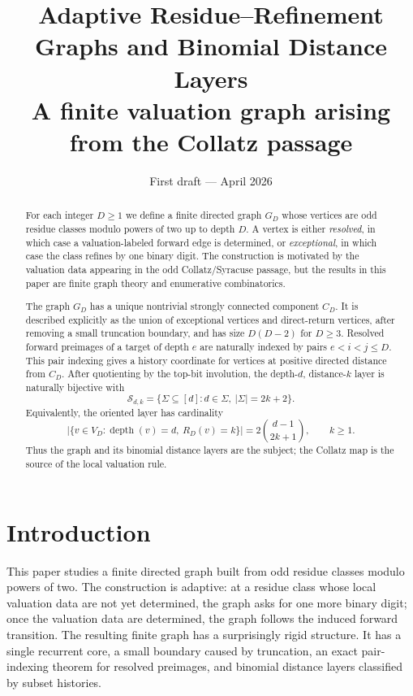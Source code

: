\documentclass[11pt]{article}
\title{Adaptive Residue--Refinement Graphs and Binomial Distance Layers\\
\large A finite valuation graph arising from the Collatz passage}
\author{}
\date{First draft --- April 2026}
\theoremstyle{definition}
\theoremstyle{remark}
\newcommand{\depth}{\operatorname{depth}}
\newcommand{\Sfam}{\mathcal S}
\begin{document}
\maketitle

\begin{abstract}
For each integer $D\ge 1$ we define a finite directed graph $G_D$ whose vertices are odd residue classes modulo powers of two up to depth $D$.  A vertex is either \emph{resolved}, in which case a valuation-labeled forward edge is determined, or \emph{exceptional}, in which case the class refines by one binary digit.  The construction is motivated by the valuation data appearing in the odd Collatz/Syracuse passage, but the results in this paper are finite graph theory and enumerative combinatorics.

The graph $G_D$ has a unique nontrivial strongly connected component $C_D$.  It is described explicitly as the union of exceptional vertices and direct-return vertices, after removing a small truncation boundary, and has size $D(D-2)$ for $D\ge 3$.  Resolved forward preimages of a target of depth $e$ are naturally indexed by pairs $e<i<j\le D$.  This pair indexing gives a history coordinate for vertices at positive directed distance from $C_D$.  After quotienting by the top-bit involution, the depth-$d$, distance-$k$ layer is naturally bijective with
\[
\Sfam_{d,k}=\{\Sigma\subseteq [d]: d\in\Sigma,\ |\Sigma|=2k+2\}.
\]
Equivalently, the oriented layer has cardinality
\[
\bigl|\{v\in V_D:\depth(v)=d,\ R_D(v)=k\}\bigr|
=2\binom{d-1}{2k+1},\qquad k\ge 1.
\]
Thus the graph and its binomial distance layers are the subject; the Collatz map is the source of the local valuation rule.
\end{abstract}

\tableofcontents

\section{Introduction}

This paper studies a finite directed graph built from odd residue classes modulo powers of two.  The construction is adaptive: at a residue class whose local valuation data are not yet determined, the graph asks for one more binary digit; once the valuation data are determined, the graph follows the induced forward transition.  The resulting finite graph has a surprisingly rigid structure.  It has a single recurrent core, a small boundary caused by truncation, an exact pair-indexing theorem for resolved preimages, and binomial distance layers classified by subset histories.
\end{document}
